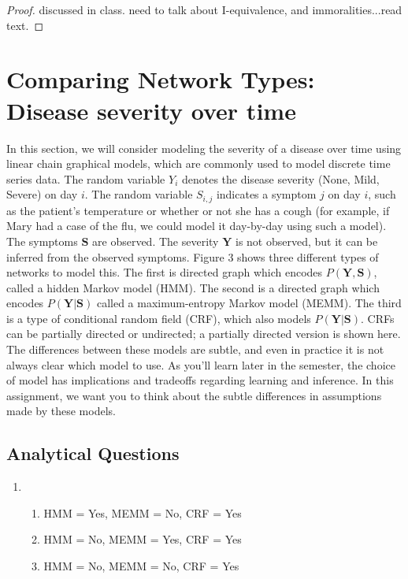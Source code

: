 \documentclass[12pt]{article}
\begin{document}
\begin{enumerate}[1.]
\begin{proof}
discussed in class. need to talk about I-equivalence, and immoralities...read text.
\end{proof}

\end{enumerate}
\section{Comparing Network Types: Disease severity over time}
In this section, we will consider modeling the severity of a disease over time using linear chain graphical models, which are commonly used to model discrete time series data.
The random variable $Y_i$ denotes the disease severity (None, Mild, Severe) on day $i$. The random variable $S_{i,j}$ indicates a symptom $j$ on day $i$, such as the patient’s temperature or whether or not she has a cough (for example, if Mary had a case of the flu, we could model it day-by-day using such a model). The symptoms $\mathbf{S}$ are observed. The severity $\mathbf{Y}$ is not observed, but it can be inferred from the observed symptoms.
Figure 3 shows three different types of networks to model this. The first is directed graph which encodes $P(\mathbf{Y}, \mathbf{S})$, called a hidden Markov model (HMM). The second is a directed graph which encodes $P(\mathbf{Y}|\mathbf{S})$ called a maximum-entropy Markov model (MEMM). The third is a type of conditional random field (CRF), which also models $P(\mathbf{Y}|\mathbf{S})$. CRFs can be partially directed or undirected; a partially directed version is shown here.
The differences between these models are subtle, and even in practice it is not always clear which model to use. As you’ll learn later in the semester, the choice of model has implications and tradeoffs regarding learning and inference. In this assignment, we want you to think about the subtle differences in assumptions made by these models.
\subsection{Analytical Questions}

\begin{enumerate}[1.]
	\item 
		\begin{enumerate}[(a.)]
			\item HMM = Yes, MEMM = No, CRF = Yes
			\item HMM = No, MEMM = Yes, CRF = Yes
			\item HMM = No, MEMM = No, CRF = Yes
		\end{enumerate}
\end{enumerate}
\end{document}
